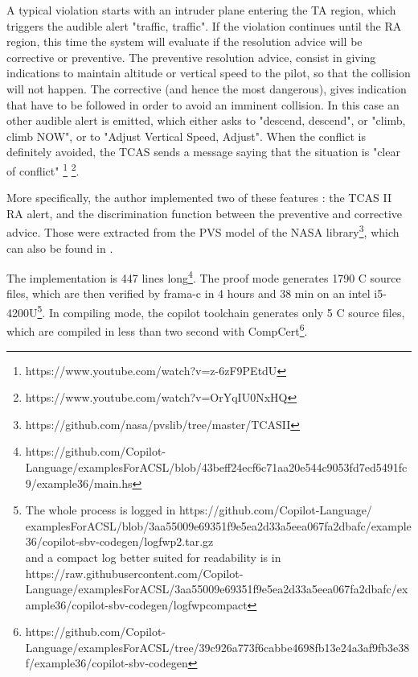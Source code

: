 \documentclass[a4paper,11pt,final]{article}
\begin{document}
	A typical violation starts with an intruder plane entering the TA region, which triggers the audible alert "traffic, traffic". If the violation continues until the RA region, this time the system will evaluate if the resolution advice will be corrective or preventive. The preventive resolution advice, consist in giving indications to maintain altitude or vertical speed to the pilot, so that the collision will not happen. The corrective (and hence the most dangerous), gives indication that have to be followed in order to avoid an imminent collision. In this case an other audible alert is emitted, which either asks to "descend, descend", or "climb, climb NOW", or to "Adjust Vertical Speed, Adjust". When the conflict is definitely avoided, the TCAS sends a message saying  that the situation is "clear of conflict" \footnote{https://www.youtube.com/watch?v=z-6zF9PEtdU} \footnote{https://www.youtube.com/watch?v=OrYqIU0NxHQ}.
	
	More specifically, the author implemented two of these features : the TCAS II RA alert, and the discrimination function between the preventive and corrective advice. Those were extracted from the PVS model of the NASA library\footnote{https://github.com/nasa/pvslib/tree/master/TCASII}, which can also be found in \cite{MNC13GNC}. 
	
	The implementation is 447 lines long\footnote{https://github.com/Copilot-Language/examplesForACSL/blob/43beff24ecf6c71aa20e544c9053fd7ed5491fc9/example36/main.hs}. The proof mode generates 1790 C source files, which are then verified by frama-c in 4 hours and 38 min on an intel i5-4200U\footnote{The whole process is logged in https://github.com/Copilot-Language/\\examplesForACSL/blob/3aa55009e69351f9e5ea2d33a5eea067fa2dbafc/example36/copilot-sbv-codegen/logfwp2.tar.gz \\ and a compact log better suited for readability is in https://raw.githubusercontent.com/Copilot-Language/examplesForACSL/3aa55009e69351f9e5ea2d33a5eea067fa2dbafc/example36/copilot-sbv-codegen/logfwpcompact}. In compiling mode, the copilot toolchain generates only 5 C source files, which are compiled in less than two second with CompCert\footnote{https://github.com/Copilot-Language/examplesForACSL/tree/39c926a773f6cabbe4698fb13e24a3af9fb3e38f/example36/copilot-sbv-codegen}.
	
\end{document}
